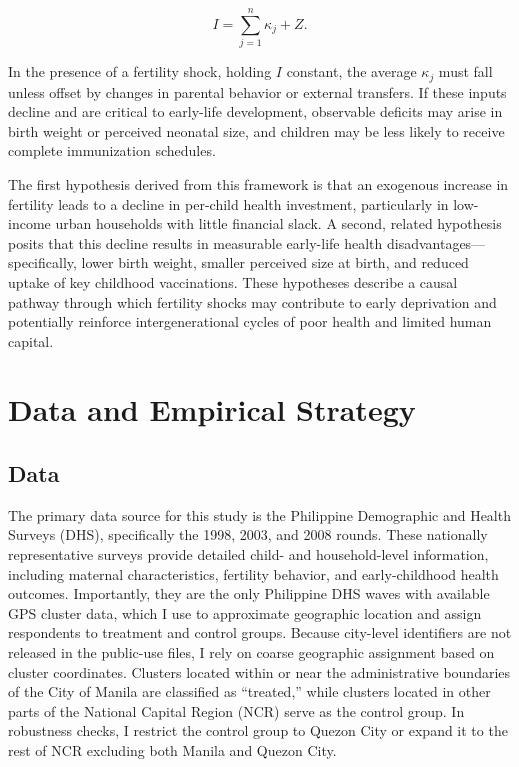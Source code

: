\documentclass[]{AEA}
\begin{document}
\[
I = \sum_{j=1}^{n} \kappa_j + Z.
\]

In the presence of a fertility shock, holding \(I\) constant, the
average \(\kappa_j\) must fall unless offset by changes in parental
behavior or external transfers. If these inputs decline and are critical
to early-life development, observable deficits may arise in birth weight
or perceived neonatal size, and children may be less likely to receive
complete immunization schedules.

The first hypothesis derived from this framework is that an exogenous
increase in fertility leads to a decline in per-child health investment,
particularly in low-income urban households with little financial slack.
A second, related hypothesis posits that this decline results in
measurable early-life health disadvantages---specifically, lower birth
weight, smaller perceived size at birth, and reduced uptake of key
childhood vaccinations. These hypotheses describe a causal pathway
through which fertility shocks may contribute to early deprivation and
potentially reinforce intergenerational cycles of poor health and
limited human capital.

\section{Data and Empirical Strategy}

\subsection{Data}

The primary data source for this study is the Philippine Demographic and
Health Surveys (DHS), specifically the 1998, 2003, and 2008 rounds.
These nationally representative surveys provide detailed child- and
household-level information, including maternal characteristics,
fertility behavior, and early-childhood health outcomes. Importantly,
they are the only Philippine DHS waves with available GPS cluster data,
which I use to approximate geographic location and assign respondents to
treatment and control groups. Because city-level identifiers are not
released in the public-use files, I rely on coarse geographic assignment
based on cluster coordinates. Clusters located within or near the
administrative boundaries of the City of Manila are classified as
``treated,'' while clusters located in other parts of the National
Capital Region (NCR) serve as the control group. In robustness checks, I
restrict the control group to Quezon City or expand it to the rest of
NCR excluding both Manila and Quezon City.
\end{document}
